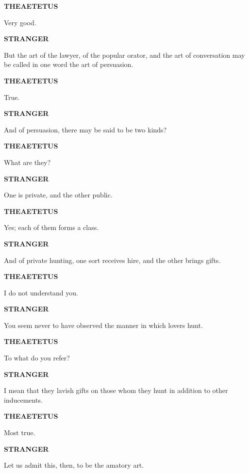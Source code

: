 \documentclass[11pt,letter]{article}
\begin{document}
\par \textbf{THEAETETUS}
\par   Very good.

\par \textbf{STRANGER}
\par   But the art of the lawyer, of the popular orator, and the art of conversation may be called in one word the art of persuasion.

\par \textbf{THEAETETUS}
\par   True.

\par \textbf{STRANGER}
\par   And of persuasion, there may be said to be two kinds?

\par \textbf{THEAETETUS}
\par   What are they?

\par \textbf{STRANGER}
\par   One is private, and the other public.

\par \textbf{THEAETETUS}
\par   Yes; each of them forms a class.

\par \textbf{STRANGER}
\par   And of private hunting, one sort receives hire, and the other brings gifts.

\par \textbf{THEAETETUS}
\par   I do not understand you.

\par \textbf{STRANGER}
\par   You seem never to have observed the manner in which lovers hunt.

\par \textbf{THEAETETUS}
\par   To what do you refer?

\par \textbf{STRANGER}
\par   I mean that they lavish gifts on those whom they hunt in addition to other inducements.

\par \textbf{THEAETETUS}
\par   Most true.

\par \textbf{STRANGER}
\par   Let us admit this, then, to be the amatory art.
\end{document}
